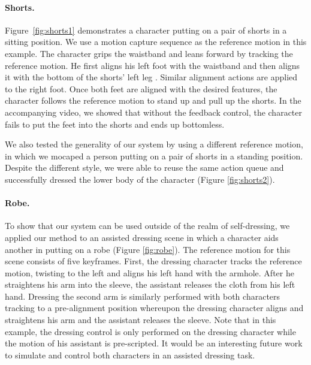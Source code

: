 \paragraph{Shorts.} Figure~\ref{fig:shorts1} demonstrates a character putting on a pair of shorts in a sitting position. We use a motion capture sequence as the reference motion in this example. The character grips the waistband and leans forward by tracking the reference motion. He first aligns his left foot with the waistband and then aligns it with the bottom of the shorts' left leg . Similar alignment actions are applied to the right foot. Once both feet are aligned with the desired features, the character follows the reference motion to stand up and pull up the shorts. In the accompanying video, we showed that without the feedback control, the character fails to put the feet into the shorts and ends up bottomless.

We also tested the generality of our system by using a different reference motion, in which we mocaped a person putting on a pair of shorts in a standing position. Despite the different style, we were able to reuse the same action queue and successfully dressed the lower body of the character (Figure \ref{fig:shorts2}).

\paragraph{Robe.} To show that our system can be used outside of the realm of self-dressing, we applied our method to an assisted dressing scene in which a character aids another in putting on a robe (Figure \ref{fig:robe}). The reference motion for this scene consists of five keyframes. First, the dressing character tracks the reference motion, twisting to the left and aligns his left hand with the armhole. After he straightens his arm into the sleeve, the assistant releases the cloth from his left hand. Dressing the second arm is similarly performed with both characters tracking to a pre-alignment position whereupon the dressing character aligns and straightens his arm and the assistant releases the sleeve. Note that in this example, the dressing control is only performed on the dressing character while the motion of his assistant is pre-scripted. It would be an interesting future work to simulate and control both characters in an assisted dressing task.
